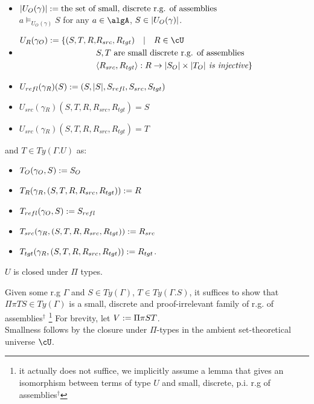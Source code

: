 \documentclass[12pt,a4paper]{article}
\def\src{_{src}}\alwaysmath{src}
\def\rfl{_{refl}}\alwaysmath{rfl}
\def\tgt{_{tgt}}\alwaysmath{tgt}
\renewcommand{\O}{_{O}}
\newcommand{\R}{\ensuremath{_{R}}}
\begin{document}
\begin{itemize}
  \item $\carr{U\O(\gamma)} \define \text{the set of small, discrete r.g. of assemblies}$ \\
   $a \vDash_{U\O(\gamma)} S$ for any $a \in \algA$, $S \in \carr{U\O(\gamma)}$. 
   
  \item $\begin{aligned}
  U\R(\gamma\O) \define \{(S,T, R, & R\src, R\tgt) \quad|\quad R \in \cU \\
  & S,T \text{ are small discrete r.g. of assemblies} \\
  & \langle R\src, R\tgt\rangle : R \to \carr{S\O} \times \carr{T\O} \textit { is injective} \}
  \end{aligned}$
  
  \item $U\rfl(\gamma\R)(S) \define (S, \carr{S}, S\rfl, S\src, S\tgt)$
  
  \item $U\src(\gamma\R)(S, T, R, R\src, R\tgt) = S$
  
  \item $U\src(\gamma\R)(S, T, R, R\src, R\tgt) = T$
\end{itemize}
and $T \in Ty(\Gamma . U)$ as:
\begin{itemize}
  \item $T\O(\gamma\O, S) \define S\O$
  \item $T\R(\gamma\R, (S,T, R, R\src, R\tgt)) \define R$
  \item $T\rfl(\gamma\O, S) \define S\rfl$
  \item $T\src(\gamma\R, (S,T, R, R\src, R\tgt)) \define R\src$
  \item $T\tgt(\gamma\R, (S,T, R, R\src, R\tgt)) \define R\tgt$.
\end{itemize}
\begin{claim} $U$ is closed under $\Pi$ types.
\end{claim}
Given some r.g $\Gamma$ and $S \in Ty(\Gamma)$, $T \in Ty(\Gamma.S)$, it suffices to show that $\Pi \pi T S \in Ty(\Gamma)$ is a small, discrete and proof-irrelevant family of r.g. of assemblies$^\dagger$ \footnote{it actually does not suffice, we implicitly assume a lemma that gives an isomorphism between terms of type $U$ and small, discrete, p.i. r.g of assemblies$^\dagger$} For brevity, let $V := \Pi \pi S T$.\\

Smallness follows by the closure under $\Pi$-types in the ambient set-theoretical universe $\cU$.\\
\end{document}
